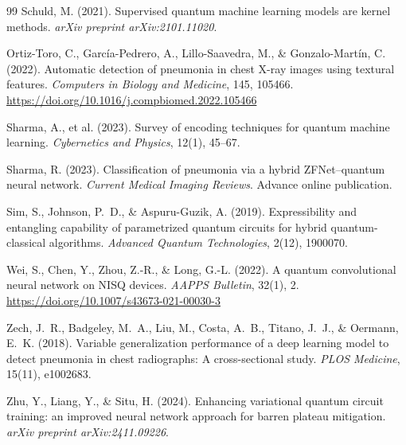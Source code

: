 \documentclass[11pt,a4paper]{article}
\begin{document}
\begin{thebibliography}{99}
Schuld, M. (2021). Supervised quantum machine learning models are kernel
methods. \emph{arXiv preprint arXiv:2101.11020}.

Ortiz-Toro, C., Garc\'ia-Pedrero, A., Lillo-Saavedra, M., \& Gonzalo-Mart\'in,
C. (2022). Automatic detection of pneumonia in chest X-ray images using
textural features. \emph{Computers in Biology and Medicine}, 145, 105466.
\url{https://doi.org/10.1016/j.compbiomed.2022.105466}

Sharma, A., et al. (2023). Survey of encoding techniques for quantum machine
learning. \emph{Cybernetics and Physics}, 12(1), 45--67.

Sharma, R. (2023). Classification of pneumonia via a hybrid ZFNet--quantum
neural network. \emph{Current Medical Imaging Reviews}. Advance online
publication.

Sim, S., Johnson, P.~D., \& Aspuru-Guzik, A. (2019). Expressibility and
entangling capability of parametrized quantum circuits for hybrid
quantum-classical algorithms. \emph{Advanced Quantum Technologies}, 2(12),
1900070.

Wei, S., Chen, Y., Zhou, Z.-R., \& Long, G.-L. (2022). A quantum convolutional
neural network on NISQ devices. \emph{AAPPS Bulletin}, 32(1), 2.
\url{https://doi.org/10.1007/s43673-021-00030-3}

Zech, J.~R., Badgeley, M.~A., Liu, M., Costa, A.~B., Titano, J.~J., \&
Oermann, E.~K. (2018). Variable generalization performance of a deep learning
model to detect pneumonia in chest radiographs: A cross-sectional study.
\emph{PLOS Medicine}, 15(11), e1002683.

Zhu, Y., Liang, Y., \& Situ, H. (2024). Enhancing variational quantum circuit
training: an improved neural network approach for barren plateau mitigation.
\emph{arXiv preprint arXiv:2411.09226}.

\end{thebibliography}
\end{document}
